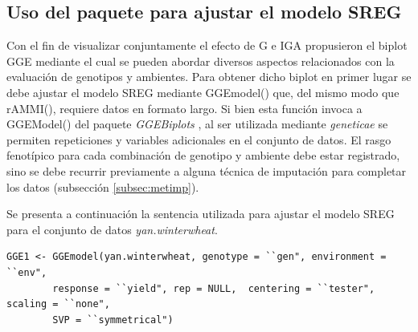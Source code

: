 \subsection{Uso del paquete para ajustar el modelo SREG}
\label{subsec:SREGpaquete}
Con el fin de visualizar conjuntamente el efecto de G e IGA \citet{Yanetal2000} propusieron el biplot GGE mediante el cual se pueden abordar diversos aspectos relacionados con la evaluación de genotipos y ambientes. Para obtener dicho biplot en primer lugar se debe ajustar el modelo SREG mediante \textcolor{fandango}{GGEmodel()} que, del mismo modo que \textcolor{fandango}{rAMMI()}, requiere datos en formato largo. Si bien esta función invoca a \textcolor{fandango}{GGEModel()} del paquete \emph{GGEBiplots} \citep{Dumble2017}, al ser utilizada mediante \emph{geneticae} se permiten repeticiones y variables adicionales en el conjunto de datos. El rasgo fenotípico para cada combinación de genotipo y ambiente debe estar registrado, sino se debe recurrir previamente a alguna técnica de imputación para completar los datos (subsección \ref{subsec:metimp}). 

Se presenta a continuación la sentencia utilizada para ajustar el modelo SREG para el conjunto de datos \emph{yan.winterwheat}.

\begin{center}
\begin{tcolorbox}[colframe=aurometalsaurus,colback=backcolour,colbacklower=white,
   				width=1\linewidth,
    			height=0.11\linewidth,
    			boxsep=-3mm]
\begin{lstlisting}
GGE1 <- GGEmodel(yan.winterwheat, genotype = ``gen", environment = ``env",  
        response = ``yield", rep = NULL,  centering = ``tester", scaling = ``none",  
        SVP = ``symmetrical")
\end{lstlisting}
\end{tcolorbox}
\end{center}

